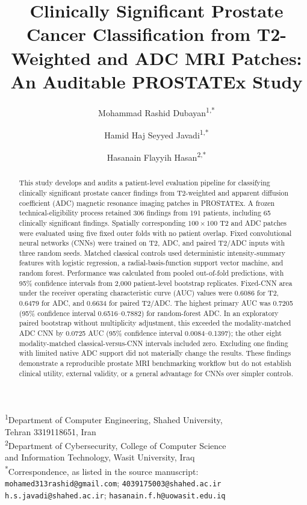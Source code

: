 \documentclass[11pt]{article}
\title{Clinically Significant Prostate Cancer Classification from T2-Weighted and ADC MRI Patches: An Auditable PROSTATEx Study}
\author{Mohammad Rashid Dubayan\textsuperscript{1,*} \and
Hamid Haj Seyyed Javadi\textsuperscript{1,*} \and
Hasanain Flayyih Hasan\textsuperscript{2,*}}
\date{}
\begin{document}
\maketitle
\begin{center}
\small
\textsuperscript{1}Department of Computer Engineering, Shahed University,\\
Tehran 3319118651, Iran\\
\textsuperscript{2}Department of Cybersecurity, College of Computer Science\\
and Information Technology, Wasit University, Iraq\\[0.5em]
\textsuperscript{*}Correspondence, as listed in the source manuscript:\\
\nolinkurl{mohamed313rashid@gmail.com}; \nolinkurl{4039175003@shahed.ac.ir}\\
\nolinkurl{h.s.javadi@shahed.ac.ir}; \nolinkurl{hasanain.f.h@uowasit.edu.iq}
\end{center}

\begin{abstract}

This study develops and audits a patient-level evaluation pipeline for classifying clinically significant prostate cancer findings from T2-weighted and apparent diffusion coefficient (ADC) magnetic resonance imaging patches in PROSTATEx. A frozen technical-eligibility process retained 306 findings from 191 patients, including 65 clinically significant findings. Spatially corresponding $100\times100$ T2 and ADC patches were evaluated using five fixed outer folds with no patient overlap. Fixed convolutional neural networks (CNNs) were trained on T2, ADC, and paired T2/ADC inputs with three random seeds. Matched classical controls used deterministic intensity-summary features with logistic regression, a radial-basis-function support vector machine, and random forest. Performance was calculated from pooled out-of-fold predictions, with 95\% confidence intervals from 2,000 patient-level bootstrap replicates. Fixed-CNN area under the receiver operating characteristic curve (AUC) values were 0.6086 for T2, 0.6479 for ADC, and 0.6634 for paired T2/ADC. The highest primary AUC was 0.7205 (95\% confidence interval 0.6516--0.7882) for random-forest ADC. In an exploratory paired bootstrap without multiplicity adjustment, this exceeded the modality-matched ADC CNN by 0.0725 AUC (95\% confidence interval 0.0084--0.1397); the other eight modality-matched classical-versus-CNN intervals included zero. Excluding one finding with limited native ADC support did not materially change the results. These findings demonstrate a reproducible prostate MRI benchmarking workflow but do not establish clinical utility, external validity, or a general advantage for CNNs over simpler controls.

\end{abstract}
\end{document}
